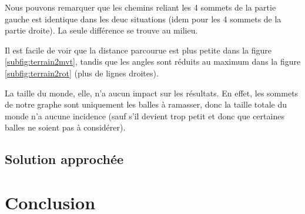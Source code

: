 \documentclass[12pt]{article}
\begin{document}
    Nous pouvons remarquer que les chemins reliant les 4 sommets de la partie gauche est identique dans les deuc situations (idem pour les 4 sommets de la partie droite). La seule différence se trouve au milieu.

    Il est facile de voir que la distance parcourue est plus petite dans la figure \ref{subfig:terrain2mvt}, tandis que les angles sont réduits au maximum dans la figure \ref{subfig:terrain2rot} (plus de lignes droites).

    \bigskip

    La taille du monde, elle, n'a aucun impact sur les résultats. En effet, les sommets de notre graphe sont uniquement les balles à ramasser, donc la taille totale du monde n'a aucune incidence (sauf s'il devient trop petit et donc que certaines balles ne soient pas à considérer).

    \subsection{Solution approchée}
    \label{subsec:result_approch}

    \section{Conclusion}
    \label{sec:ccl}
\end{document}
